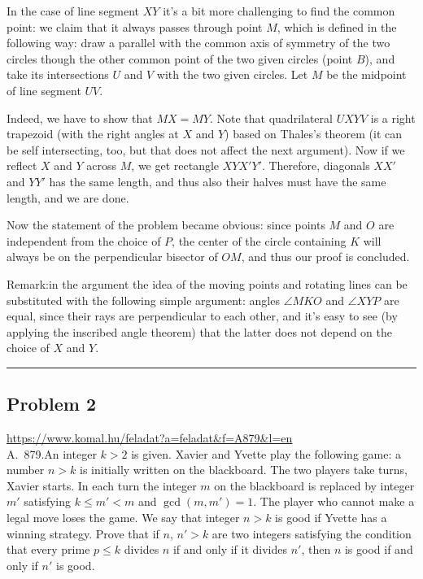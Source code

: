 \documentclass{article}
\begin{document}
In the case of line segment \(\displaystyle XY\) it's a bit more challenging to find the common point: we claim that it always passes through point \(\displaystyle M\), which is defined in the following way: draw a parallel with the common axis of symmetry of the two circles though the other common point of the two given circles (point \(\displaystyle B\)), and take its intersections \(\displaystyle U\) and \(\displaystyle V\) with the two given circles. Let \(\displaystyle M\) be the midpoint of line segment \(\displaystyle UV\).

Indeed, we have to show that \(\displaystyle MX=MY\). Note that quadrilateral \(\displaystyle UXYV\) is a right trapezoid (with the right angles at \(\displaystyle X\) and \(\displaystyle Y\)) based on Thales's theorem (it can be self intersecting, too, but that does not affect the next argument). Now if we reflect \(\displaystyle X\) and \(\displaystyle Y\) across \(\displaystyle M\), we get rectangle \(\displaystyle XYX'Y'\). Therefore, diagonals \(\displaystyle XX'\) and \(\displaystyle YY'\) has the same length, and thus also their halves must have the same length, and we are done.

Now the statement of the problem became obvious: since points \(\displaystyle M\) and \(\displaystyle O\) are independent from the choice of \(\displaystyle P\), the center of the circle containing \(\displaystyle K\) will always be on the perpendicular bisector of \(\displaystyle OM\), and thus our proof is concluded.

Remark:in the argument the idea of the moving points and rotating lines can be substituted with the following simple argument: angles \(\displaystyle \angle MKO\) and \(\displaystyle \angle XYP\) are equal, since their rays are perpendicular to each other, and it's easy to see (by applying the inscribed angle theorem) that the latter does not depend on the choice of \(\displaystyle X\) and \(\displaystyle Y\).

\vspace{1em}
\hrule
\vspace{1em}

\subsection*{Problem 2}
\noindent\url{https://www.komal.hu/feladat?a=feladat&f=A879&l=en}\\[1em]

A. 879.An integer \(\displaystyle k>2\) is given. Xavier and Yvette play the following game: a number \(\displaystyle n>k\) is initially written on the blackboard. The two players take turns, Xavier starts. In each turn the integer \(\displaystyle m\) on the blackboard is replaced by integer \(\displaystyle m'\) satisfying \(\displaystyle k\le m'<m\) and \(\displaystyle \gcd (m,m')=1\). The player who cannot make a legal move loses the game. We say that integer \(\displaystyle n>k\) is good if Yvette has a winning strategy. Prove that if \(\displaystyle n\), \(\displaystyle n'>k\) are two integers satisfying the condition that every prime \(\displaystyle p\le k\) divides \(\displaystyle n\) if and only if it divides \(\displaystyle n'\), then \(\displaystyle n\) is good if and only if \(\displaystyle n'\) is good.
\end{document}
